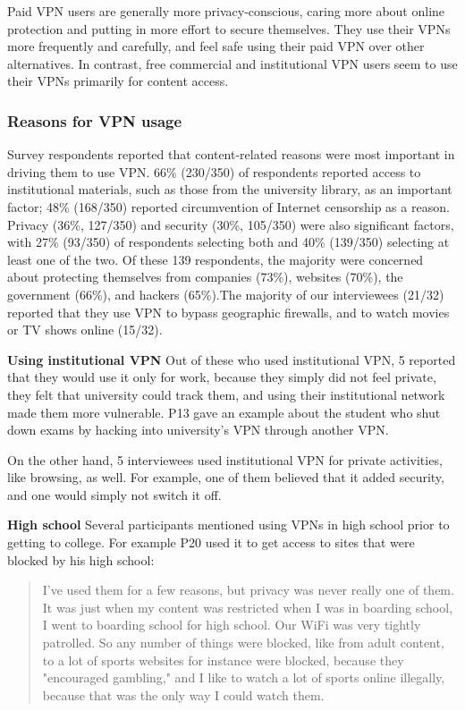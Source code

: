 Paid VPN users are generally more privacy-conscious, caring more about online
protection and putting in more effort to secure themselves. They use their
VPNs more frequently and carefully, and feel safe using their paid VPN over
other alternatives. In contrast, free commercial and institutional VPN users
seem to use their VPNs primarily for content access.





\subsubsection{Reasons for VPN usage}
Survey respondents reported that content-related reasons were most important
in driving them to use VPN. 66\% (230/350) of respondents reported access to
institutional materials, such as those from the university library, as an
important factor; 48\% (168/350) reported circumvention of Internet censorship
as a reason. Privacy (36\%, 127/350) and security (30\%, 105/350) were also
significant factors, with 27\% (93/350) of respondents selecting both and 40\%
(139/350) selecting at least one of the two. Of these 139 respondents, the
majority were concerned about protecting themselves from companies (73\%),
websites (70\%), the government (66\%), and hackers (65\%).The majority of our interviewees (21/32) reported
that they use VPN to bypass geographic firewalls, and to watch movies
or TV shows online (15/32).  

\textbf{Using institutional VPN} Out of these who used institutional
VPN, 5 reported that they would use it only for work, because they simply did
not feel private, they felt that university could track them, and using their
institutional network made them more vulnerable. P13 gave an example about the
student who shut down exams by hacking into university's VPN through another
VPN. %

On the other hand, 5 interviewees used institutional VPN for private
activities, like browsing, as well. For example, one of them believed that it
added security, and one would simply not switch it off. 

\textbf{High school} Several participants mentioned using VPNs in high school prior to getting to college. For example P20 used it to get access to sites that were
blocked by his high school: 
\begin{quote}I've used them for a few reasons,
    but privacy was never really one of them. It was just when my content was
    restricted when I was in boarding school, I went to boarding
    school for high school. Our WiFi was very tightly patrolled. So any number
    of things were blocked, like from adult content, to a lot of sports
    websites for instance were blocked, because they "encouraged gambling,"
    and I like to watch a lot of sports online illegally, because that was the
    only way I could watch them.\end{quote}

